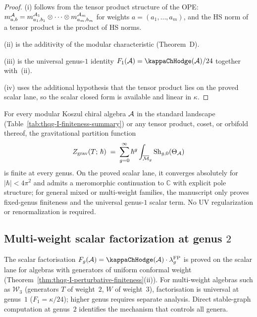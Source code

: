\begin{proof}
(i) follows from the tensor product structure of the OPE: $m^{\mathcal{A}}_{a,b} = m^{\mathcal{A}_1}_{a_1,b_1} \otimes \cdots \otimes m^{\mathcal{A}_m}_{a_m,b_m}$ for weights $a = (a_1,\ldots,a_m)$, and the HS norm of a tensor product is the product of HS norms.

(ii) is the additivity of the modular characteristic (Theorem~D).

(iii) is the universal genus-$1$ identity
$F_1(\cA)=\kappaChHodge(\cA)/24$ together with~(ii).

(iv) uses the additional hypothesis that the tensor product lies on the
proved scalar lane, so the scalar closed form is available and linear in
$\kappa$.
\end{proof}

\begin{remark}
For every modular Koszul chiral algebra $\mathcal{A}$ in the standard landscape \textup{(}Table~\textup{\ref{tab:thqg-I-finiteness-summary})} or any tensor product, coset, or orbifold thereof, the gravitational partition function
\[
Z_{\mathrm{grav}}(T;\,\hbar) \;=\; \sum_{g=0}^\infty \hbar^g \int_{\overline{\mathcal{M}}_g} \operatorname{Sh}_{g,0}(\Theta_{\mathcal{A}})
\]
is finite at every genus. On the proved scalar lane, it converges
absolutely for $|\hbar| < 4\pi^2$ and admits a meromorphic continuation
to $\mathbb{C}$ with explicit pole structure; for general mixed or
multi-weight families, the manuscript only proves fixed-genus finiteness
and the universal genus-$1$ scalar term. No UV regularization or
renormalization is required.
\end{remark}



\subsection{Multi-weight scalar factorization at genus $2$}
\label{subsec:thqg-I-multi-weight-genus-2}

The scalar factorisation $F_g(\cA) = \kappaChHodge(\cA) \cdot
\lambda_g^{\mathrm{FP}}$ is proved on the scalar lane for algebras
with generators of uniform conformal weight
(Theorem~\ref{thm:thqg-I-perturbative-finiteness}(ii)). For
multi-weight algebras such as $\mathcal{W}_3$ (generators $T$ of
weight~$2$, $W$ of weight~$3$), factorisation is universal at
genus~$1$ ($F_1 = \kappa/24$); higher genus requires separate
analysis. Direct stable-graph computation at genus~$2$ identifies
the mechanism that controls all genera.


